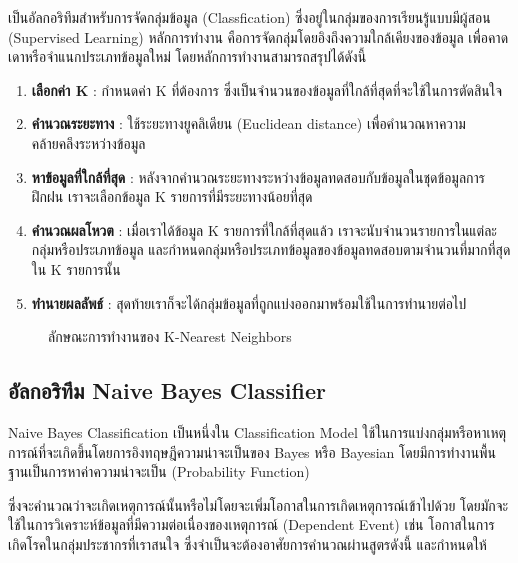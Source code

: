 เป็นอัลกอริทึมสำหรับการจัดกลุ่มข้อมูล (Classfication) ซึ่งอยู่ในกลุ่มของการเรียนรู้แบบมีผู้สอน (Supervised Learning)
หลักการทำงาน คือการจัดกลุ่มโดยอิงถึงความใกล้เคียงของข้อมูล เพื่อคาดเดาหรือจำแนกประเภทข้อมูลใหม่ \cite{kNeighbor} โดยหลักการทำงานสามารถสรุปได้ดังนี้
\begin{enumerate}
      \item  \textbf{เลือกค่า K} : กำหนดค่า K ที่ต้องการ ซึ่งเป็นจำนวนของข้อมูลที่ใกล้ที่สุดที่จะใช้ในการตัดสินใจ
      \item  \textbf{คำนวณระยะทาง} : ใช้ระยะทางยูคลิเดียน (Euclidean distance) เพื่อคำนวณหาความคล้ายคลึงระหว่างข้อมูล
      \item  \textbf{หาข้อมูลที่ใกล้ที่สุด} : หลังจากคำนวณระยะทางระหว่างข้อมูลทดสอบกับข้อมูลในชุดข้อมูลการฝึกฝน เราจะเลือกข้อมูล K รายการที่มีระยะทางน้อยที่สุด
      \item  \textbf{คำนวณผลโหวต} : เมื่อเราได้ข้อมูล K รายการที่ใกล้ที่สุดแล้ว เราจะนับจำนวนรายการในแต่ละกลุ่มหรือประเภทข้อมูล
            และกำหนดกลุ่มหรือประเภทข้อมูลของข้อมูลทดสอบตามจำนวนที่มากที่สุดใน K รายการนั้น
      \item  \textbf{ทำนายผลลัพธ์} : สุดท้ายเราก็จะได้กลุ่มข้อมูลที่ถูกแบ่งออกมาพร้อมใช้ในการทำนายต่อไป
\end{enumerate}

\begin{figure}[!h]\centering
      \setlength{\fboxrule}{0.2mm} %
      \setlength{\fboxsep}{1cm}
      \caption{ลักษณะการทำงานของ K-Nearest Neighbors}\label{fig:knn}
\end{figure}

\subsection{อัลกอริทึม Naive Bayes Classifier}
Naive Bayes Classification เป็นหนึ่งใน Classification Model ใช้ในการแบ่งกลุ่มหรือหาเหตุการณ์ที่จะเกิดขึ้นโดยการอิงทฤษฎีความน่าจะเป็นของ
Bayes หรือ Bayesian โดยมีการทำงานพื้นฐานเป็นการหาค่าความน่าจะเป็น (Probability Function)
\par ซึ่งจะคำนวณว่าจะเกิดเหตุการณ์นั้นหรือไม่โดยจะเพิ่มโอกาสในการเกิดเหตุการณ์เข้าไปด้วย
โดยมักจะใช้ในการวิเคราะห์ข้อมูลที่มีความต่อเนื่องของเหตุการณ์ (Dependent Event) เช่น
โอกาสในการเกิดโรคในกลุ่มประชากรที่เราสนใจ \cite{naiveBayes-1,naiveBayes-2} ซึ่งจำเป็นจะต้องอาศัยการคำนวณผ่านสูตรดังนี้ และกำหนดให้

